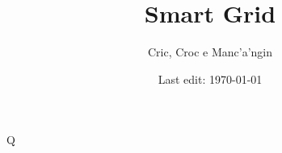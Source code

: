 \documentclass{article}
\title{Smart Grid} %
\author{Cric, Croc e Manc'a'ngin } %
\date{Last edit: \today} %
\newcommand{\initial}[1]{ %
\lettrine[lines=3,lhang=0.3,nindent=0em]{
\color{DarkGoldenrod}
{\textsf{#1}}}{}}
\begin{document}
\maketitle %

\thispagestyle{fancy} %


\initial{Q}\textbf{}





\begin{thebibliography}{99} %

\end{thebibliography}

\end{document}
